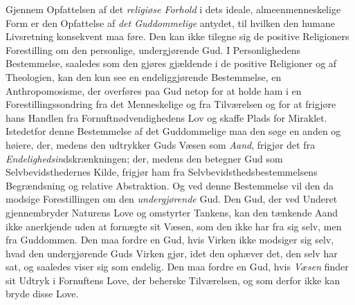 \documentclass[12pt,a4paper,openany]{book}
\newcommand{\opage}[1]{\marginnote{\footnotesize\textit{[#1]}}}
\begin{document}
Gjennem Opfattelsen af det \emph{religiøse Forhold} i dets
ideale, almeenmenneskelige Form er den Opfattelse af \emph{det
Guddommelige} antydet, til hvilken den humane Livsretning
konsekvent maa føre. Den kan ikke tilegne sig de
positive Religioners Forestilling om den personlige, undergjørende
Gud. I Personlighedens Bestemmelse, saaledes
som den gjøres gjældende i de positive Religioner og af
Theologien, kan den kun see en endeliggjørende Bestemmelse,
en Anthropomosisme, der overføres paa Gud netop for at
holde ham i en Forestillingssondring fra det Menneskelige og
\opage{501}fra Tilværelsen og for at frigjøre hans Handlen fra Fornuftnødvendighedens
Lov og skaffe Plads for Miraklet. Istedetfor
denne Bestemmelse af det Guddommelige maa den søge
en anden og høiere, der, medens den udtrykker Guds Væsen
som \emph{Aand}, frigjør det fra \emph{Endelighedsin}dskrænkningen;
der, medens den betegner Gud som Selvbevidsthedernes Kilde,
frigjør ham fra Selvbevidsthedsbestemmelsens Begrændsning
og relative Abstraktion. Og ved denne Bestemmelse vil den
da modsige Forestillingen om den \emph{undergjørende} Gud.
Den Gud, der ved Underet gjennembryder Naturens Love
og omstyrter Tankens, kan den tænkende Aand ikke anerkjende
uden at fornægte sit Væsen, som den ikke har fra sig selv,
men fra Guddommen. Den maa fordre en Gud, hvis Virken
ikke modsiger sig selv, hvad den undergjørende Guds Virken
gjør, idet den ophæver det, den selv har sat, og saaledes viser
sig som endelig. Den maa fordre en Gud, hvis \emph{Væsen}
finder sit Udtryk i Fornuftens Love, der beherske Tilværelsen,
og som derfor ikke kan bryde disse Love.
\end{document}

